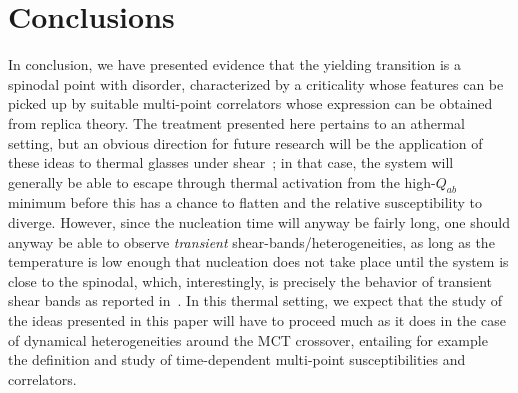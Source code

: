 \documentclass[9pt,twocolumn,twoside]{pnas-new}
\begin{document}
\section*{Conclusions}
In conclusion, we have presented evidence that the yielding transition is a spinodal point with disorder, characterized by a criticality whose features can be picked up by suitable multi-point correlators whose expression can be obtained from replica theory. The treatment presented here pertains to an athermal setting, but an obvious direction for future research will be the application of these ideas to thermal glasses under shear~\cite{16SCH}; in that case, the system will generally be able to escape through thermal activation from the high-$Q_{ab}$ minimum before this has a chance to flatten and the relative susceptibility to diverge. However, since the nucleation time will anyway be fairly long, one should anyway be able to observe \emph{transient} shear-bands/heterogeneities, as long as the temperature is low enough that nucleation does not take place until the system is close to the spinodal, which, interestingly, is precisely the behavior of transient shear bands as reported in~\cite{16SCH}. In this thermal setting, we expect that the study of the ideas presented in this paper will have to proceed much as it does in the case of dynamical heterogeneities around the MCT crossover, entailing for example the definition and study of time-dependent multi-point susceptibilities and correlators.



\showacknow %



\end{document}
